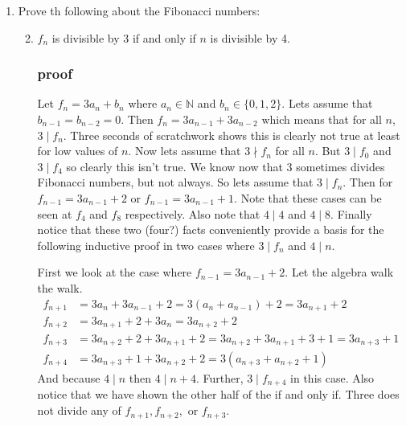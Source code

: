 \documentclass{article}
\begin{document}
\begin{enumerate}
\begin{enumerate}
\end{enumerate}
\setcounter{enumi}{2}
\item
Prove th following about the Fibonacci numbers:
\begin{enumerate}
\setcounter{enumii}{1}
\item
$f_n$ is divisible by 3 if and only if $n$ is divisible by 4.
\subsubsection*{proof}
Let $f_n=3a_n+b_n$ where $a_n\in\mathbb{N}$ and $b_n\in\{0,1,2\}$.
Lets assume that $b_{n-1}=b_{n-2}=0$.
Then $f_n=3a_{n-1}+3a_{n-2}$ which means that for all $n$, $3\mid f_n$.
Three seconds of scratchwork shows this is clearly not true at least for low values of $n$.
Now lets assume that $3\nmid f_n$ for all $n$.
But $3\mid f_0$ and $3\mid f_4$ so clearly this isn't true.
We know now that 3 sometimes divides Fibonacci numbers, but not always.
So lets assume that $3\mid f_{n}$.
Then for $f_{n-1}=3a_{n-1}+2$ or $f_{n-1}=3a_{n-1}+1$.
Note that these cases can be seen at $f_4$ and $f_8$ respectively.
Also note that $4\mid4$ and $4\mid8$.
Finally notice that these two (four?) facts conveniently provide a basis for the following inductive proof in two cases where $3\mid f_n$ and $4\mid n$.

First we look at the case where $f_{n-1}=3a_{n-1}+2$.
Let the algebra walk the walk.
\begin{align*}
  f_{n+1}&=3a_n+3a_{n-1}+2=3(a_n+a_{n-1})+2=3a_{n+1}+2\\
  f_{n+2}&=3a_{n+1}+2+3a_n=3a_{n+2}+2\\
  f_{n+3}&=3a_{n+2}+2+3a_{n+1}+2=3a_{n+2}+3a_{n+1}+3+1=3a_{n+3}+1\\
  f_{n+4}&=3a_{n+3}+1+3a_{n+2}+2=3(a_{n+3}+a_{n+2}+1)
\end{align*}
And because $4\mid n$ then $4\mid n+4$.
Further, $3\mid f_{n+4}$ in this case.
Also notice that we have shown the other half of the if and only if.
Three does not divide any of $f_{n+1},f_{n+2},$ or $f_{n+3}$.


\end{enumerate}
\end{enumerate}
\end{document}
